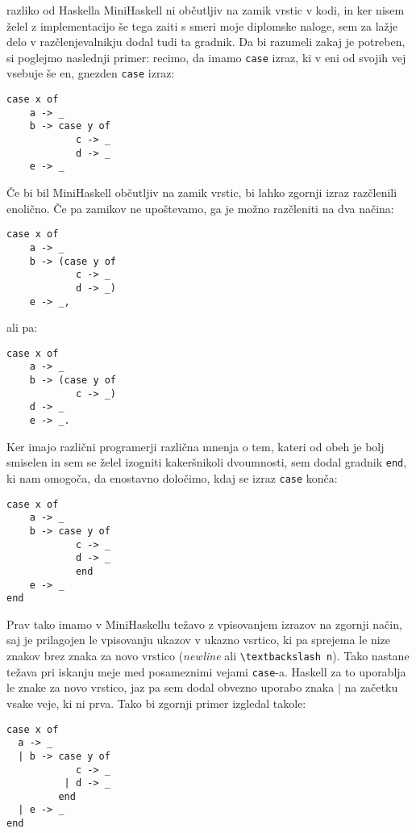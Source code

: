 \documentclass[12pt,a4paper,openany]{book}
\begin{document}
razliko od Haskella MiniHaskell ni občutljiv na zamik vrstic v kodi, in ker nisem želel z implementacijo še tega zaiti s smeri moje diplomske naloge, sem za lažje delo v razčlenjevalnikju 
dodal tudi ta gradnik. Da bi razumeli zakaj je potreben, si poglejmo naslednji primer: recimo, da imamo \lstinline{case} izraz, ki v eni od svojih vej vsebuje še en, gnezden \lstinline{case} 
izraz:
\begin{lstlisting}
case x of 
    a -> _
    b -> case y of
            c -> _
            d -> _
    e -> _
\end{lstlisting}
Če bi bil MiniHaskell občutljiv na zamik vrstic, bi lahko zgornji izraz razčlenili enolično. Če pa zamikov ne upoštevamo, ga je možno razčleniti na dva načina:
\begin{lstlisting}
case x of 
    a -> _
    b -> (case y of
            c -> _
            d -> _)
    e -> _,
\end{lstlisting}
ali pa:
\begin{lstlisting}
case x of 
    a -> _
    b -> (case y of
            c -> _)
    d -> _
    e -> _.
\end{lstlisting}
Ker imajo različni programerji različna mnenja o tem, kateri od obeh je bolj smiselen in sem se želel izogniti kakeršnikoli dvoumnosti, sem dodal 
gradnik \lstinline{end}, ki nam omogoča, da enostavno določimo, kdaj se izraz \lstinline{case} konča:
\begin{lstlisting}
case x of 
    a -> _
    b -> case y of
            c -> _
            d -> _
            end
    e -> _
end
\end{lstlisting}
Prav tako imamo v MiniHaskellu težavo z vpisovanjem izrazov na zgornji način, saj je prilagojen le vpisovanju ukazov v ukazno vsrtico, ki pa 
sprejema le nize znakov brez znaka za novo vrstico (\emph{newline} ali \lstinline{\textbackslash n}). Tako nastane težava pri iskanju meje med posameznimi vejami
\lstinline{case}-a. Haskell za to uporablja le znake za novo vrstico, jaz pa sem dodal obvezno uporabo znaka $\mid$ na začetku vsake veje, ki ni prva.
Tako bi zgornji primer izgledal takole:
\begin{lstlisting}
case x of 
  a -> _
  | b -> case y of
            c -> _
          | d -> _
         end
  | e -> _
end
\end{lstlisting}
\end{document}

